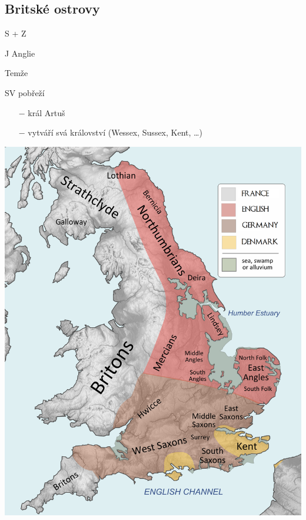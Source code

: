 \documentclass{article}
\begin{document}
\subsection*{Britské ostrovy}
\begin{minipage}{0.7\textwidth}\raggedleft
    \vspace{-3em}
    \begin{description}
        \setlength\itemsep{0.15em}
        \item[Keltové] S + Z
        \item[Jutové] J Anglie
        \item[Sasové] Temže
        \item[Anglové] SV pobřeží
    \end{description}
    \begin{itemize}
        \setlength\itemsep{0.15em}
        \item[$-$] král Artuš
        \item[$-$] vytváří svá království (Wessex, Sussex, Kent, \dots)
    \end{itemize}
\end{minipage}
\hfill
\noindent\begin{minipage}{0.3\textwidth}
    \vspace{-5em}\includegraphics[width=\linewidth]{britanie.png}
\end{minipage}
\end{document}
